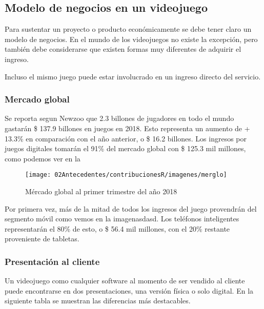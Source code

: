 \subsection{Modelo de negocios en un videojuego}\label{modeloNegocio}
Para sustentar un proyecto o producto económicamente se debe tener claro un modelo de negocios. En el mundo de los videojuegos no existe la excepción, pero también debe considerarse que existen formas muy diferentes de adquirir el ingreso.

Incluso el mismo juego puede estar involucrado en un ingreso directo del servicio.

\subsubsection{Mercado global}
Se reporta segun Newzoo que 2.3 billones de jugadores en todo el mundo gastarán \$ 137.9 billones en juegos en 2018. Esto representa un aumento de + 13.3\% en comparación con el año anterior, o \$ 16.2 billones. Los ingresos por juegos digitales tomarán el 91\% del mercado global con \$ 125.3 mil millones, como podemos ver en la \cite{fig:merglo}
\begin{figure}
	\centering
	\caption{Mércado global al primer trimestre del año 2018}
	\label{fig:merglo}
	\texttt{[image: 02Antecedentes/contribucionesR/imagenes/merglo]}
\end{figure}

Por primera vez, más de la mitad de todos los ingresos del juego provendrán del segmento móvil como vemos en la imagen{asdasd}. Los teléfonos inteligentes representarán el 80\% de esto, o \$ 56.4 mil millones, con el 20\% restante proveniente de tabletas.


\subsubsection{Presentación al cliente}
Un videojuego como cualquier software al momento de ser vendido al cliente puede encontrarse en dos presentaciones, una versión física o solo digital. En la siguiente tabla \cite{fiDi} se muestran las diferencias más destacables.

